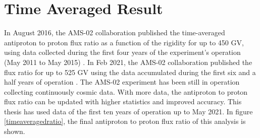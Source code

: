 
\section{Time Averaged Result}

In August 2016, the AMS-02 collaboration published the time-averaged antiproton to proton flux ratio as a function of the rigidity for up to 450 GV, using data collected during the first four years of the experiment’s operation (May 2011 to May 2015) \cite{AMS02AntiprotonPRL2016}. In Feb 2021, the AMS-02 collaboration published the flux ratio for up to 525 GV using the data accumulated during the first six and a half years of operation \cite{PhysicsReport2}. The AMS-02 experiment has been still in operation collecting continuously cosmic data. With more data, the antiproton to proton flux ratio can be updated with higher statistics and improved accuracy. This thesis has used data of the first ten years of operation up to May 2021. In figure \ref{timeaveragedratio}, the final antiproton to proton flux ratio of this analysis is shown. \par


